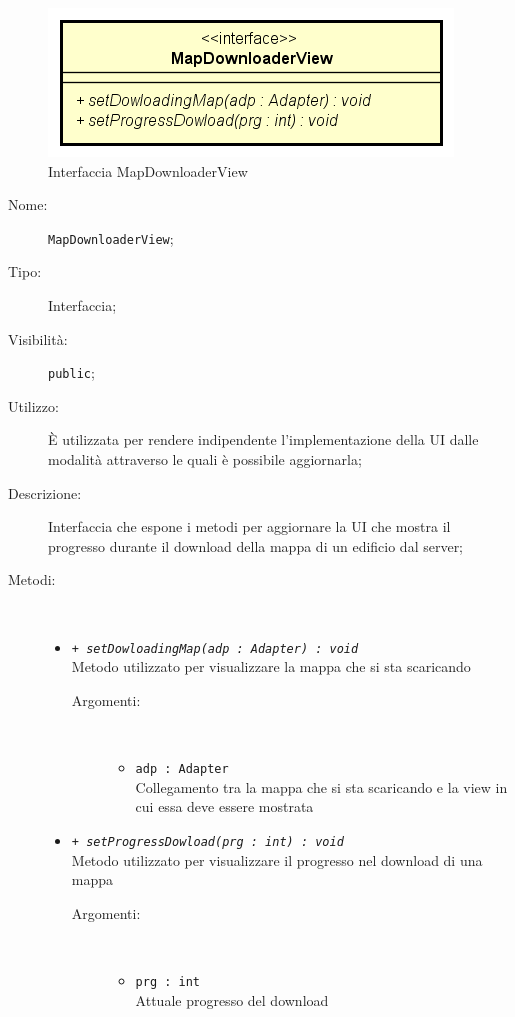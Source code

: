 \documentclass[../DefinizioneDiProdotto.tex]{subfiles}
\begin{document}
    \begin{figure}[H]
        \centering
        \includegraphics{img/MapDownloaderView.png}
        \caption{Interfaccia MapDownloaderView}\label{fig:view::MapDownloaderView} 
    \end{figure}
    \begin{description}
\item[Nome:] \texttt{MapDownloaderView};
\item[Tipo:] Interfaccia;
\item[Visibilità:] \texttt{public};
\item[Utilizzo:] È utilizzata per rendere indipendente l'implementazione della UI dalle modalità attraverso le quali è possibile aggiornarla;
\item[Descrizione:] Interfaccia che espone i metodi per aggiornare la UI che mostra il progresso durante il download della mappa di un edificio dal server;
\item[Metodi:] \
\begin{itemize}
\item \texttt{+ \textit{setDowloadingMap(adp : Adapter) : void}}\\
Metodo utilizzato per visualizzare la mappa che si sta scaricando
 \begin{description}
\item[Argomenti:] \
\begin{itemize}
\item \texttt{adp : Adapter}\\
Collegamento tra la mappa che si sta scaricando e la view in cui essa deve essere mostrata\end{itemize}
\end{description}
\item \texttt{+ \textit{setProgressDowload(prg : int) : void}}\\
Metodo utilizzato per visualizzare il progresso nel download di una mappa
 \begin{description}
\item[Argomenti:] \
\begin{itemize}
\item \texttt{prg : int}\\
Attuale progresso del download\end{itemize}
\end{description}
\end{itemize}
\end{description}
\end{document}
